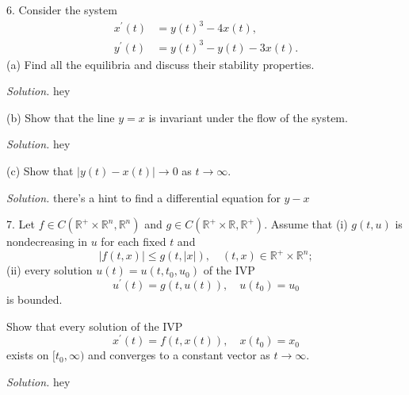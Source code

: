 \documentclass{article}
\newcommand{\R}{\mathbb{R}}
\begin{document}
\newpage

6. Consider the system
%
\begin{align*}
    x^\prime(t) &= y(t)^3 - 4 x(t), \\
    y^\prime(t) &= y(t)^3 - y(t) - 3 x(t).
\end{align*}
%
(a) Find all the equilibria and discuss their stability properties.

\textit{Solution.}
hey

\vspace{5mm}

(b) Show that the line $y = x$ is invariant under the flow of the system.

\textit{Solution.}
hey

\vspace{5mm}

(c) Show that $|y(t) - x(t)| \to 0$ as $t \to \infty$.

\textit{Solution.}
there's a hint to find a differential equation for $y - x$

\newpage

7. Let $f \in C(\R^+ \times \R^n, \R^n)$ and $g \in C(\R^+ \times \R, \R^+)$.
Assume that (i) $g(t, u)$ is nondecreasing in $u$ for each fixed $t$ and
%
\begin{equation*}
    |f(t, x)| \leq g(t, |x|), \quad (t, x) \in \R^+ \times \R^n;
\end{equation*}
%
(ii) every solution $u(t) = u(t, t_0, u_0)$ of the IVP
%
\begin{equation*}
    u^\prime(t) = g(t, u(t)), \quad u(t_0) = u_0
\end{equation*}
%
is bounded.

Show that every solution of the IVP
%
\begin{equation*}
    x^\prime(t) = f(t, x(t)), \quad x(t_0) = x_0
\end{equation*}
%
exists on $[t_0, \infty)$ and converges to a constant vector as $t \to \infty$.

\textit{Solution.}
hey
\end{document}
